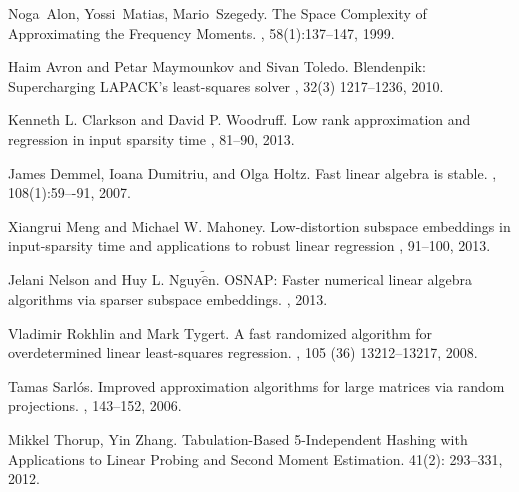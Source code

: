 \documentclass[11pt]{article}
\begin{document}


\begin{thebibliography}{42}

Noga~Alon, Yossi~Matias, Mario~Szegedy.
\newblock The Space Complexity of Approximating the Frequency Moments.
, 58(1):137--147, 1999.

Haim Avron and Petar Maymounkov and Sivan Toledo.
\newblock Blendenpik: Supercharging LAPACK's least-squares solver
, 32(3) 1217--1236, 2010.

Kenneth L. Clarkson and David P. Woodruff.
\newblock Low rank approximation and regression in input sparsity time
, 81--90, 2013.

James Demmel, Ioana Dumitriu, and Olga Holtz.
\newblock Fast linear algebra is stable. 
, 108(1):59–-91, 2007.

Xiangrui Meng and Michael W. Mahoney.
\newblock Low-distortion subspace embeddings in input-sparsity time and applications to robust linear regression
, 91--100, 2013.

Jelani Nelson and Huy L. Nguy$\tilde{\hat{\mbox{e}}}$n.
\newblock OSNAP: Faster numerical linear algebra algorithms via sparser subspace embeddings.
, 2013.


Vladimir Rokhlin and Mark Tygert.
\newblock A fast randomized algorithm for overdetermined linear least-squares regression.
, 105 (36) 13212--13217, 2008.

Tamas Sarl\'{o}s.
\newblock Improved approximation algorithms for large matrices via random projections.
, 143--152, 2006.

Mikkel Thorup, Yin Zhang.
\newblock Tabulation-Based 5-Independent Hashing with Applications to Linear Probing and Second Moment Estimation. 
 41(2): 293--331, 2012.

\end{thebibliography}
\end{document}
